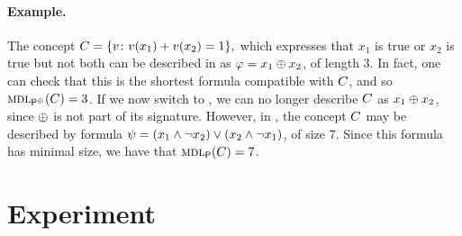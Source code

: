 \paragraph*{Example.}The concept $
C=\{v\colon v(x_1)+v(x_2)=1\},
$
which expresses that $x_1$ is true or $x_2$ is true but not both can be described in \gramboolxor as $\varphi=x_{1} \oplus x_{2}$, of length 3. In fact, one can check that this is the shortest formula compatible with $C$, and so $\textsc{mdl}_{{\sf P}^\oplus}(C)=3$. If we now switch to \grambool, we can no longer describe $C$ as $x_{1} \oplus x_{2}$, since $\oplus$ is not part of its signature. However, in \grambool, the concept $C$ may be described by  formula $\psi=(x_{1} \wedge \neg x_{2}) \vee (x_{2} \wedge \neg x_{1})$, of size 7. Since this formula has minimal size, we have that $\textsc{mdl}_{{\sf P}}(C)=7$.

\section{Experiment}


\renewcommand*{\arraystretch}{1.2}
   
